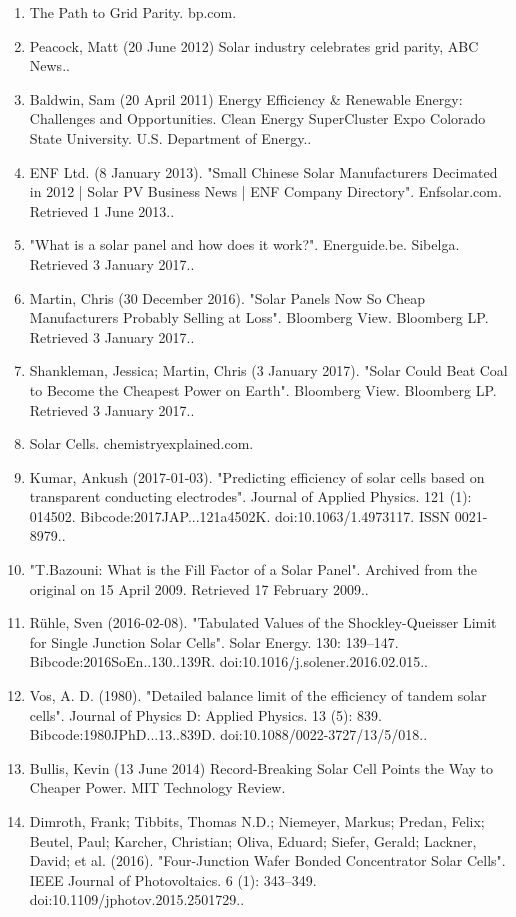 \begin{enumerate}
\item The Path to Grid Parity. bp.com.
\item Peacock, Matt (20 June 2012) Solar industry celebrates grid parity, ABC News..
\item Baldwin, Sam (20 April 2011) Energy Efficiency & Renewable Energy: Challenges and Opportunities. Clean Energy SuperCluster Expo Colorado State University. U.S. Department of Energy..
\item ENF Ltd. (8 January 2013). "Small Chinese Solar Manufacturers Decimated in 2012 | Solar PV Business News | ENF Company Directory". Enfsolar.com. Retrieved 1 June 2013..
\item "What is a solar panel and how does it work?". Energuide.be. Sibelga. Retrieved 3 January 2017..
\item Martin, Chris (30 December 2016). "Solar Panels Now So Cheap Manufacturers Probably Selling at Loss". Bloomberg View. Bloomberg LP. Retrieved 3 January 2017..
\item Shankleman, Jessica; Martin, Chris (3 January 2017). "Solar Could Beat Coal to Become the Cheapest Power on Earth". Bloomberg View. Bloomberg LP. Retrieved 3 January 2017..
\item Solar Cells. chemistryexplained.com.
\item  Kumar, Ankush (2017-01-03). "Predicting efficiency of solar cells based on transparent conducting electrodes". Journal of Applied Physics. 121 (1): 014502. Bibcode:2017JAP...121a4502K. doi:10.1063/1.4973117. ISSN 0021-8979..
\item "T.Bazouni: What is the Fill Factor of a Solar Panel". Archived from the original on 15 April 2009. Retrieved 17 February 2009..
\item Rühle, Sven (2016-02-08). "Tabulated Values of the Shockley-Queisser Limit for Single Junction Solar Cells". Solar Energy. 130: 139–147. Bibcode:2016SoEn..130..139R. doi:10.1016/j.solener.2016.02.015..
\item Vos, A. D. (1980). "Detailed balance limit of the efficiency of tandem solar cells". Journal of Physics D: Applied Physics. 13 (5): 839. Bibcode:1980JPhD...13..839D. doi:10.1088/0022-3727/13/5/018..
\item Bullis, Kevin (13 June 2014) Record-Breaking Solar Cell Points the Way to Cheaper Power. MIT Technology Review.
\item Dimroth, Frank; Tibbits, Thomas N.D.; Niemeyer, Markus; Predan, Felix; Beutel, Paul; Karcher, Christian; Oliva, Eduard; Siefer, Gerald; Lackner, David; et al. (2016). "Four-Junction Wafer Bonded Concentrator Solar Cells". IEEE Journal of Photovoltaics. 6 (1): 343–349. doi:10.1109/jphotov.2015.2501729..

\end{enumerate}
